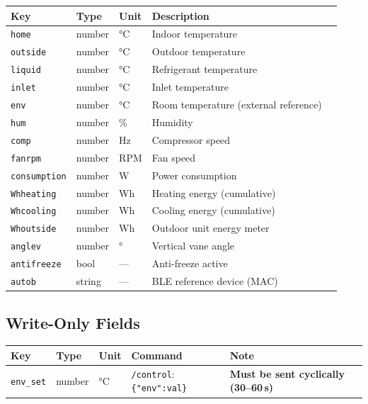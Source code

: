 \documentclass[11pt,a4paper]{article}
\newcommand{\field}[1]{\texttt{\color{codegreen}#1}}
\begin{document}
\begin{tabular}{@{}lllll@{}}
\toprule
\textbf{Key} & \textbf{Type} & \textbf{Unit} & \textbf{Description} \\
\midrule
\rowcolor{lightbg}
\field{home}        & number & °C  & Indoor temperature \\
\field{outside}     & number & °C  & Outdoor temperature \\
\rowcolor{lightbg}
\field{liquid}      & number & °C  & Refrigerant temperature \\
\field{inlet}       & number & °C  & Inlet temperature \\
\rowcolor{lightbg}
\field{env}         & number & °C  & Room temperature (external reference) \\
\field{hum}         & number & \%  & Humidity \\
\rowcolor{lightbg}
\field{comp}        & number & Hz  & Compressor speed \\
\field{fanrpm}      & number & RPM & Fan speed \\
\rowcolor{lightbg}
\field{consumption} & number & W   & Power consumption \\
\field{Whheating}   & number & Wh  & Heating energy (cumulative) \\
\rowcolor{lightbg}
\field{Whcooling}   & number & Wh  & Cooling energy (cumulative) \\
\field{Whoutside}   & number & Wh  & Outdoor unit energy meter \\
\rowcolor{lightbg}
\field{anglev}      & number & °   & Vertical vane angle \\
\field{antifreeze}  & bool   & —   & Anti-freeze active \\
\rowcolor{lightbg}
\field{autob}       & string & —   & BLE reference device (MAC) \\
\bottomrule
\end{tabular}

\subsection{Write-Only Fields}

\begin{tabularx}{\textwidth}{@{}llllX@{}}
\toprule
\textbf{Key} & \textbf{Type} & \textbf{Unit} & \textbf{Command} & \textbf{Note} \\
\midrule
\rowcolor{lightbg}
\field{env\_set} & number & °C & \texttt{/control}: \texttt{\{"env":val\}} & \textbf{Must be sent cyclically (30–60\,s)} \\
\bottomrule
\end{tabularx}
\end{document}

